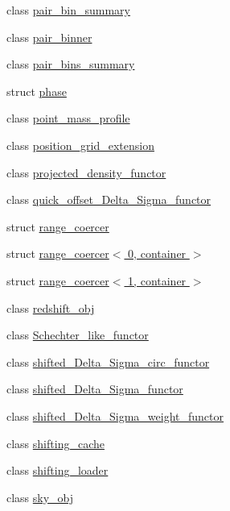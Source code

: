 \begin{DoxyCompactItemize}
class \hyperlink{classIceBRG_1_1pair__bin__summary}{pair\+\_\+bin\+\_\+summary}
\item 
class \hyperlink{classIceBRG_1_1pair__binner}{pair\+\_\+binner}
\item 
class \hyperlink{classIceBRG_1_1pair__bins__summary}{pair\+\_\+bins\+\_\+summary}
\item 
struct \hyperlink{structIceBRG_1_1phase}{phase}
\item 
class \hyperlink{classIceBRG_1_1point__mass__profile}{point\+\_\+mass\+\_\+profile}
\item 
class \hyperlink{classIceBRG_1_1position__grid__extension}{position\+\_\+grid\+\_\+extension}
\item 
class \hyperlink{classIceBRG_1_1projected__density__functor}{projected\+\_\+density\+\_\+functor}
\item 
class \hyperlink{classIceBRG_1_1quick__offset__Delta__Sigma__functor}{quick\+\_\+offset\+\_\+\+Delta\+\_\+\+Sigma\+\_\+functor}
\item 
struct \hyperlink{structIceBRG_1_1range__coercer}{range\+\_\+coercer}
\item 
struct \hyperlink{structIceBRG_1_1range__coercer_3_010_00_01container_01_4}{range\+\_\+coercer$<$ 0, container $>$}
\item 
struct \hyperlink{structIceBRG_1_1range__coercer_3_011_00_01container_01_4}{range\+\_\+coercer$<$ 1, container $>$}
\item 
class \hyperlink{classIceBRG_1_1redshift__obj}{redshift\+\_\+obj}
\item 
class \hyperlink{classIceBRG_1_1Schechter__like__functor}{Schechter\+\_\+like\+\_\+functor}
\item 
class \hyperlink{classIceBRG_1_1shifted__Delta__Sigma__circ__functor}{shifted\+\_\+\+Delta\+\_\+\+Sigma\+\_\+circ\+\_\+functor}
\item 
class \hyperlink{classIceBRG_1_1shifted__Delta__Sigma__functor}{shifted\+\_\+\+Delta\+\_\+\+Sigma\+\_\+functor}
\item 
class \hyperlink{classIceBRG_1_1shifted__Delta__Sigma__weight__functor}{shifted\+\_\+\+Delta\+\_\+\+Sigma\+\_\+weight\+\_\+functor}
\item 
class \hyperlink{classIceBRG_1_1shifting__cache}{shifting\+\_\+cache}
\item 
class \hyperlink{classIceBRG_1_1shifting__loader}{shifting\+\_\+loader}
\item 
class \hyperlink{classIceBRG_1_1sky__obj}{sky\+\_\+obj}
\item 

\end{DoxyCompactItemize}
